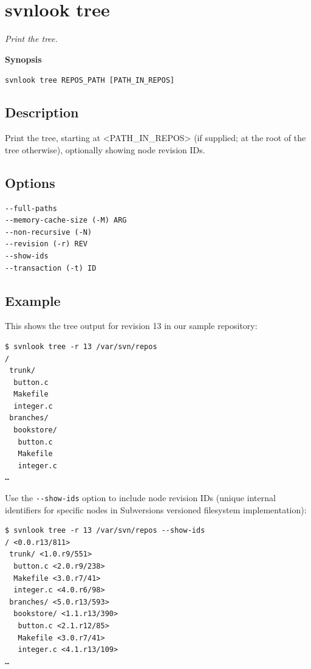 \section{svnlook tree}\label{svn.ref.svnlook.c.tree}

\emph{Print the tree.}

\textbf{Synopsis}

\texttt{svnlook\ tree\ REPOS\_PATH\ {[}PATH\_IN\_REPOS{]}}

\subsection{Description}

Print the tree, starting at \textless PATH\_IN\_REPOS\textgreater{} (if
supplied; at the root of the tree otherwise), optionally showing node
revision IDs.

\subsection{Options}

\begin{verbatim}
--full-paths
--memory-cache-size (-M) ARG
--non-recursive (-N)
--revision (-r) REV
--show-ids
--transaction (-t) ID
\end{verbatim}

\subsection{Example}

This shows the tree output for revision 13 in our sample repository:

\begin{verbatim}
$ svnlook tree -r 13 /var/svn/repos
/
 trunk/
  button.c
  Makefile
  integer.c
 branches/
  bookstore/
   button.c
   Makefile
   integer.c
…
\end{verbatim}

Use the \texttt{-\/-show-ids} option to include node revision IDs
(unique internal identifiers for specific nodes in
Subversion\textquotesingle s versioned filesystem implementation):

\begin{verbatim}
$ svnlook tree -r 13 /var/svn/repos --show-ids
/ <0.0.r13/811>
 trunk/ <1.0.r9/551>
  button.c <2.0.r9/238>
  Makefile <3.0.r7/41>
  integer.c <4.0.r6/98>
 branches/ <5.0.r13/593>
  bookstore/ <1.1.r13/390>
   button.c <2.1.r12/85>
   Makefile <3.0.r7/41>
   integer.c <4.1.r13/109>
…
\end{verbatim}

